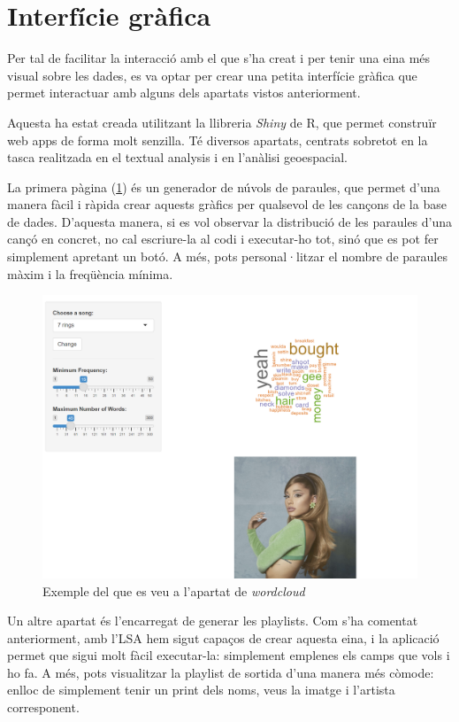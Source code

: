 \section{Interfície gràfica}

Per tal de facilitar la interacció amb el que s'ha creat i per tenir una eina més visual sobre les dades, es va optar per crear una petita interfície gràfica que permet interactuar amb alguns dels apartats vistos anteriorment.


Aquesta ha estat creada utilitzant la llibreria \textit{Shiny} de R, que permet construïr web apps de forma molt senzilla. Té diversos apartats, centrats sobretot en la tasca realitzada en el textual analysis i en l'anàlisi geoespacial.

La primera pàgina (\ref{fig:gui_wordcloud}) és un generador de núvols de paraules, que permet d'una manera fàcil i ràpida crear aquests gràfics per qualsevol de les cançons de la base de dades. D'aquesta manera, si es vol observar la distribució de les paraules d'una cançó en concret, no cal escriure-la al codi i executar-ho tot, sinó que es pot fer simplement apretant un botó. A més, pots personal·litzar el nombre de paraules màxim i la freqüència mínima.

\begin{figure}[H]
    \centering
    \includegraphics[width=0.75\linewidth]{Images//9_GUI/gui_wordcloud.png}
    \caption{Exemple del que es veu a l'apartat de \textit{wordcloud}}
    \label{fig:gui_wordcloud}
\end{figure}

Un altre apartat és l'encarregat de generar les playlists. Com s'ha comentat anteriorment, amb l'LSA hem sigut capaços de crear aquesta eina, i la aplicació permet que sigui molt fàcil executar-la: simplement emplenes els camps que vols i ho fa. A més, pots visualitzar la playlist de sortida d'una manera més còmode: enlloc de simplement tenir un print dels noms, veus la imatge i l'artista corresponent.

